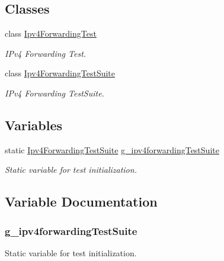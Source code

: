 \subsection*{Classes}
\begin{DoxyCompactItemize}
\item 
class \hyperlink{classIpv4ForwardingTest}{Ipv4\+Forwarding\+Test}
\begin{DoxyCompactList}\small\item\em I\+Pv4 Forwarding Test. \end{DoxyCompactList}\item 
class \hyperlink{classIpv4ForwardingTestSuite}{Ipv4\+Forwarding\+Test\+Suite}
\begin{DoxyCompactList}\small\item\em I\+Pv4 Forwarding Test\+Suite. \end{DoxyCompactList}\end{DoxyCompactItemize}
\subsection*{Variables}
\begin{DoxyCompactItemize}
\item 
static \hyperlink{classIpv4ForwardingTestSuite}{Ipv4\+Forwarding\+Test\+Suite} \hyperlink{ipv4-forwarding-test_8cc_ac7f2e9afd4786968aca95f4d1cb364ad}{g\+\_\+ipv4forwarding\+Test\+Suite}
\begin{DoxyCompactList}\small\item\em Static variable for test initialization. \end{DoxyCompactList}\end{DoxyCompactItemize}


\subsection{Variable Documentation}
\subsubsection[{\texorpdfstring{g\+\_\+ipv4forwarding\+Test\+Suite}{g_ipv4forwardingTestSuite}}]{ g\+\_\+ipv4forwarding\+Test\+Suite\hspace{0.3cm}{\ttfamily [static]}}\hypertarget{ipv4-forwarding-test_8cc_ac7f2e9afd4786968aca95f4d1cb364ad}{}\label{ipv4-forwarding-test_8cc_ac7f2e9afd4786968aca95f4d1cb364ad}


Static variable for test initialization. 

